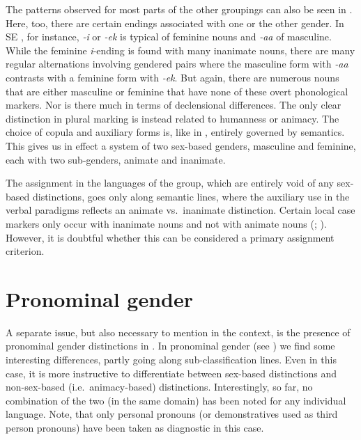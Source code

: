 \documentclass[output=collectionpaper]{langsci/langscibook}
\begin{document}
The patterns observed for most parts of the other groupings can also be seen in . Here, too, there are certain endings associated with one or the other gender. In SE , for instance, \textit{{}-i} or \textit{\nobreakdash-ek} is typical of feminine nouns and \textit{\nobreakdash-aa} of masculine. While the feminine \textit{i}{}-ending is found with many inanimate nouns, there are many regular alternations involving gendered pairs where the masculine form with \textit{\nobreakdash-aa} contrasts with a feminine form with \textit{\nobreakdash-ek}. But again, there are numerous nouns that are either masculine or feminine that have none of these overt phonological markers. Nor is there much in terms of declensional differences. The only clear distinction in plural marking is instead related to humanness or animacy. The choice of copula and auxiliary forms is, like in , entirely governed by semantics. This gives us in effect a system of two sex-based genders, masculine and feminine, each with two sub-genders, animate and inanimate.

The assignment in the languages of the  group, which are entirely void of any sex-based distinctions, goes only along semantic lines, where the auxiliary use in the verbal paradigms reflects an animate vs.\ inanimate distinction. Certain local case markers only occur with inanimate nouns and not with animate nouns (\citealt[53]{HeegardPetersen2006}; \citealt[844]{Bashir2003}). However, it is doubtful whether this can be considered a primary assignment criterion.

\section{Pronominal gender}
\label{sec:Lilje:7}

A separate issue, but also necessary to mention in the context, is the presence of pronominal gender distinctions in . In pronominal gender (see ) we find some interesting differences, partly going along sub-classification lines. Even in this case, it is more instructive to differentiate between sex-based distinctions and non-sex-based (i.e.\ animacy-based) distinctions. Interestingly, so far, no combination of the two (in the same domain) has been noted for any individual language. Note, that only personal pronouns (or demonstratives used as third person pronouns) have been taken as diagnostic in this case.
\end{document}
